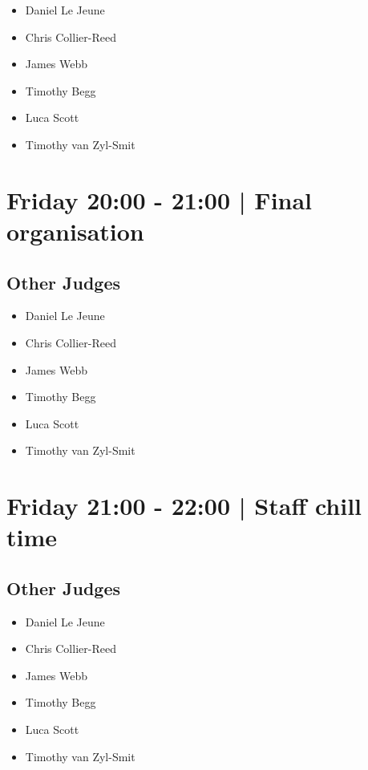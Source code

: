 \documentclass[10pt, A5]{article}
\begin{document}
            \begin{itemize}
                            \item Daniel Le Jeune
                            \item Chris Collier-Reed
                            \item James Webb
                            \item Timothy Begg
                            \item Luca Scott
                            \item Timothy van Zyl-Smit
                        \end{itemize}
        

            \section*{Friday 20:00
        -
        21:00
        |
         Final organisation}
        
                
        \subsection*{Other Judges}
        
            \begin{itemize}
                            \item Daniel Le Jeune
                            \item Chris Collier-Reed
                            \item James Webb
                            \item Timothy Begg
                            \item Luca Scott
                            \item Timothy van Zyl-Smit
                        \end{itemize}
        

            \section*{Friday 21:00
        -
        22:00
        |
         Staff chill time}
        
                
        \subsection*{Other Judges}
        
            \begin{itemize}
                            \item Daniel Le Jeune
                            \item Chris Collier-Reed
                            \item James Webb
                            \item Timothy Begg
                            \item Luca Scott
                            \item Timothy van Zyl-Smit
                        \end{itemize}
        
\end{document}
